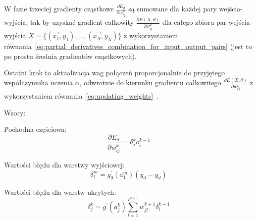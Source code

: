 \documentclass[a4paper,12pt]{article}
\numberwithin{figure}{section}
\begin{document}
    W fazie trzeciej gradienty cząstkowe $\frac{\partial E_d}{\partial w_{ij}^k}$ są sumowane dla każdej pary wejścia-wyjścia, tak by uzyskać gradient całkowity $\frac{\partial E(X,\theta)}{\partial w_{ij}^k}$ dla całego zbioru par wejścia-wyjścia $X = \{(\vec{x_1}, y_1),\dotsc,(\vec{x_N}, y_N)\}$ z wykorzystaniem równania~\ref{eq:partial_derivatives_combination_for_input_output_pairs} (jest to po prostu średnia gradientów cząstkowych).

    \bigskip

    Ostatni krok to aktualizacja wag połączeń proporcjonalnie do przyjętego współczynnika uczenia $\alpha$, odwrotnie do kierunku gradientu całkowitego $\frac{\partial E(X,\theta)}{\partial w_{ij}^k}$ z wykorzystaniem równania~\ref{eq:updating_weights}~\cite{BackpropagationBrilliant}.

    \bigskip

    Wzory:

    \bigskip

    \noindent
    \begin{minipage}[H]{\textwidth}
        \setlength\parindent{17pt} Pochodna częściowa: \\
        \begin{equation}
            \label{eq:error_func_partial_derivatives}
            \frac{\partial E_d}{\partial w_{ij}^k} = \delta_j^k o_i^{k-1}
        \end{equation}
    \end{minipage}

    \smallskip

    \noindent
    \begin{minipage}[H]{\textwidth}
        \setlength\parindent{17pt} Wartości błędu dla warstwy wyjściowej: \\
        \begin{equation}
            \label{eq:final_layer_error_term}
            \delta_1^m = g_0^{\prime} (a_1^m) (\widehat{y_d} - y_d)
        \end{equation}
    \end{minipage}

    \smallskip

    \noindent
    \begin{minipage}[H]{\textwidth}
        \setlength\parindent{17pt} Wartości błędu dla warstw ukrytych: \\
        \begin{equation}
            \label{eq:hidden_layer_error_term}
            \delta_j^k = g^{\prime} (a_j^k) \displaystyle\sum_{l=1}^{r^{k+1}} w_{jl}^{k+1} \delta_l^{k+1}
        \end{equation}
    \end{minipage}
\end{document}
